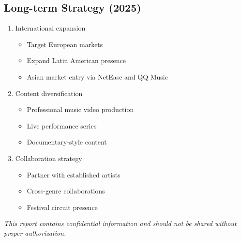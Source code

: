 \documentclass{article}
\begin{document}
\subsection*{Long-term Strategy (2025)}
\begin{enumerate}
\item International expansion
   \begin{itemize}
   \item Target European markets
   \item Expand Latin American presence
   \item Asian market entry via NetEase and QQ Music
   \end{itemize}
\item Content diversification
   \begin{itemize}
   \item Professional music video production
   \item Live performance series
   \item Documentary-style content
   \end{itemize}
\item Collaboration strategy
   \begin{itemize}
   \item Partner with established artists
   \item Cross-genre collaborations
   \item Festival circuit presence
   \end{itemize}
\end{enumerate}

\vspace{1cm}
\begin{center}
\textit{This report contains confidential information and should not be shared without proper authorization.}
\end{center}
\end{document}
